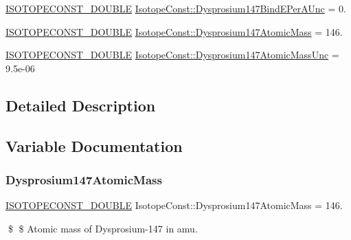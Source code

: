 \begin{DoxyCompactItemize}
\item 
\mbox{\hyperlink{group___isotope_const-_macros_ga8f45a7272ce02c0b4c65c44636ed719a}{I\+S\+O\+T\+O\+P\+E\+C\+O\+N\+S\+T\+\_\+\+D\+O\+U\+B\+LE}} \mbox{\hyperlink{group___isotope_const-_dysprosium-_dy147_ga3e46b55a649a66e95b4bb43ccb8bf5fb}{Isotope\+Const\+::\+Dysprosium147\+Bind\+E\+Per\+A\+Unc}} = 0.
\item 
\mbox{\hyperlink{group___isotope_const-_macros_ga8f45a7272ce02c0b4c65c44636ed719a}{I\+S\+O\+T\+O\+P\+E\+C\+O\+N\+S\+T\+\_\+\+D\+O\+U\+B\+LE}} \mbox{\hyperlink{group___isotope_const-_dysprosium-_dy147_ga54dfd0ddfd69d14fc3af4add7539dfd1}{Isotope\+Const\+::\+Dysprosium147\+Atomic\+Mass}} = 146.
\item 
\mbox{\hyperlink{group___isotope_const-_macros_ga8f45a7272ce02c0b4c65c44636ed719a}{I\+S\+O\+T\+O\+P\+E\+C\+O\+N\+S\+T\+\_\+\+D\+O\+U\+B\+LE}} \mbox{\hyperlink{group___isotope_const-_dysprosium-_dy147_ga92df926a5c442684a2e2de8b371e234c}{Isotope\+Const\+::\+Dysprosium147\+Atomic\+Mass\+Unc}} = 9.\+5e-\/06
\end{DoxyCompactItemize}


\subsection{Detailed Description}


\subsection{Variable Documentation}
\mbox{\label{group___isotope_const-_dysprosium-_dy147_ga54dfd0ddfd69d14fc3af4add7539dfd1}} 
\subsubsection{\texorpdfstring{Dysprosium147\+Atomic\+Mass}{Dysprosium147AtomicMass}}
{\footnotesize\ttfamily \mbox{\hyperlink{group___isotope_const-_macros_ga8f45a7272ce02c0b4c65c44636ed719a}{I\+S\+O\+T\+O\+P\+E\+C\+O\+N\+S\+T\+\_\+\+D\+O\+U\+B\+LE}} Isotope\+Const\+::\+Dysprosium147\+Atomic\+Mass = 146.}

\$ \$ Atomic mass of Dysprosium-\/147 in amu. \mbox{\label{group___isotope_const-_dysprosium-_dy147_ga92df926a5c442684a2e2de8b371e234c}} 
